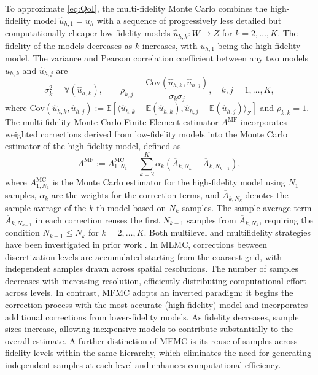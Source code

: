 To approximate \eqref{eq:QoI}, the multi-fidelity Monte Carlo combines the high-fidelity model $\widehat u_{h,1}=u_{h}$ with a sequence of progressively less detailed but computationally cheaper low-fidelity models $\widehat u_{h,k}: W \rightarrow Z$ for $k=2,\ldots,K$. The fidelity of the models decreases as $k$ increases, with $u_{h,1}$ being the high fidelity model. The variance and Pearson correlation coefficient between any two models $u_{h,k}$ and $\widehat u_{h,j}$ are
%
\begin{equation*}
    \sigma_k^2 = \mathbb{V}\left(\widehat u_{h,k}\right),\qquad \rho_{k,j} = \frac{\text{Cov}\left(\widehat u_{h,k},\widehat u_{h,j}\right)}{\sigma_k\sigma_j}, \quad k,j=1,\dots, K,
\end{equation*}
%
where $\text{Cov}(\widehat u_{h,k},\widehat u_{h,j}) := \mathbb{E}[\langle \widehat u_{h,k} - \mathbb{E}(\widehat u_{h,k}), \widehat u_{h,j} - \mathbb{E}(\widehat u_{h,j})\rangle_Z]$ and $\rho_{k,k}=1$.
The multi-fidelity Monte Carlo Finite-Element estimator $A^{\text{MF}}$ incorporates weighted corrections derived from low-fidelity models into the  Monte Carlo estimator of the high-fidelity model, defined as
%
\begin{equation}\label{eq:MFMC_estimator}
    A^{\text{MF}} := A^{\text{MC}}_{1,N_1} + \sum_{k=2}^K \alpha_k\left(\overline{A}_{k,N_k} - \overline{A}_{k,N_{k-1}} \right),
\end{equation}
%
where $A^{\text{MC}}_{1,N_1} $ is the Monte Carlo estimator for the high-fidelity model using $N_1$ samples, $\alpha_k$ are the weights for the correction terms, and $\overline{A}_{k,N_k}$ denotes the sample average of the $k$-th model based on $N_k$ samples. The sample average term $\overline{A}_{k,N_{k-1}}$ in each correction reuses the first $N_{k-1}$ samples from $\overline{A}_{k,N_{k}}$, requiring the condition $N_{k-1}\le N_k$ for $k=2,\ldots, K$. Both multilevel and multifidelity strategies have been investigated in prior work \cite{ArGuMoWi:2025,PeGuWi:2018}. In MLMC, corrections between discretization levels are accumulated starting from the coarsest grid, with independent samples drawn across spatial resolutions. The number of samples decreases with increasing resolution, efficiently distributing computational effort across levels. In contrast, MFMC adopts an inverted paradigm: it begins the correction process with the most accurate (high-fidelity) model and incorporates additional corrections from lower-fidelity models. As fidelity decreases, sample sizes increase, allowing inexpensive models to contribute substantially to the overall estimate. A further distinction of MFMC is its reuse of samples across fidelity levels within the same hierarchy, which eliminates the need for generating independent samples at each level and enhances computational efficiency.
